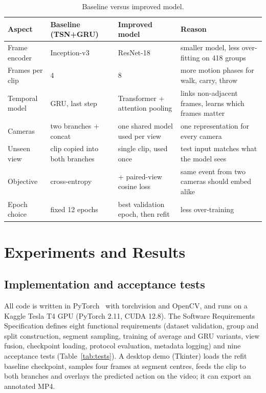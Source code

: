 \documentclass[runningheads]{llncs}
\begin{document}
\begin{table}[t]
\caption{Baseline versus improved model.}\label{tab:compare}
\centering
\scriptsize
\begin{tabularx}{\textwidth}{@{}p{1.7cm}p{2.5cm}p{2.8cm}X@{}}
\toprule
Aspect & Baseline (TSN+GRU) & Improved model & Reason \\
\midrule
Frame encoder & Inception-v3 & ResNet-18 & smaller model, less over-fitting on 418 groups \\
Frames per clip & 4 & 8 & more motion phases for walk, carry, throw \\
Temporal model & GRU, last step & Transformer + attention pooling & links non-adjacent frames, learns which frames matter \\
Cameras & two branches + concat & one shared model used per view & one representation for every camera \\
Unseen view & clip copied into both branches & single clip, used once & test input matches what the model sees \\
Objective & cross-entropy & + paired-view cosine loss & same event from two cameras should embed alike \\
Epoch choice & fixed 12 epochs & best validation epoch, then refit & less over-training \\
\bottomrule
\end{tabularx}
\end{table}

\section{Experiments and Results}\label{sec:results}
\subsection{Implementation and acceptance tests}
All code is written in PyTorch~\cite{paszke2019} with torchvision and OpenCV, and runs on a Kaggle Tesla T4 GPU (PyTorch 2.11, CUDA 12.8). The Software Requirements Specification defines eight functional requirements (dataset validation, group and split construction, segment sampling, training of average and GRU variants, view fusion, checkpoint loading, protocol evaluation, metadata logging) and nine acceptance tests (Table~\ref{tab:tests}). A desktop demo (Tkinter) loads the refit baseline checkpoint, samples four frames at segment centres, feeds the clip to both branches and overlays the predicted action on the video; it can export an annotated MP4.
\end{document}
